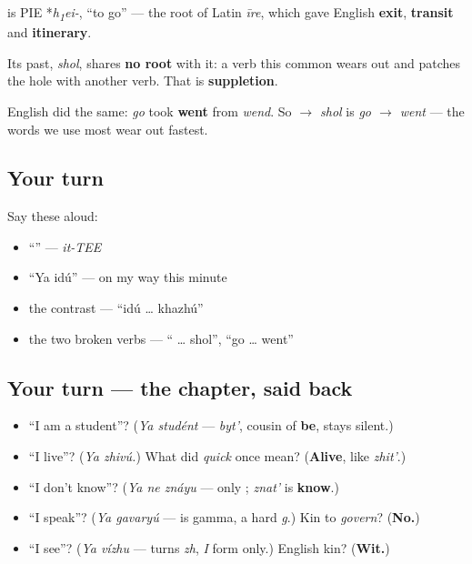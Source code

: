 \begin{cousinweb}
\textbf{} is PIE *\emph{h\textsubscript{1}ei-}, \textquotedblleft{}to go\textquotedblright{} — the root of Latin \emph{īre}, which gave English \textbf{exit}, \textbf{transit} and \textbf{itinerary}.

Its past, \emph{shol}, shares \textbf{no root} with it: a verb this common wears out and patches the hole with another verb. That is \textbf{suppletion}.

English did the same: \emph{go} took \textbf{went} from \emph{wend}. So \emph{ $\to$ shol} is \emph{go $\to$ went} — the words we use most wear out fastest.
\end{cousinweb}

\subsection*{Your turn}
Say these aloud:

\begin{itemize}
\raggedright
  \item \textquotedblleft{}\textquotedblright{} — \emph{it-TEE}
  \item \textquotedblleft{}Ya idú\textquotedblright{} — on my way this minute
  \item the contrast — \textquotedblleft{}idú … khazhú\textquotedblright{}
  \item the two broken verbs — \textquotedblleft{} … shol\textquotedblright{}, \textquotedblleft{}go … went\textquotedblright{}
\end{itemize}

\subsection*{Your turn — the chapter, said back}
\begin{itemize}
\raggedright
  \item \textquotedblleft{}I am a student\textquotedblright{}? (\emph{Ya studént} — \emph{byt'}, cousin of \textbf{be}, stays silent.)
  \item \textquotedblleft{}I live\textquotedblright{}? (\emph{Ya zhivú.}) What did \emph{quick} once mean? (\textbf{Alive}, like \emph{zhit'}.)
  \item \textquotedblleft{}I don't know\textquotedblright{}? (\emph{Ya ne znáyu} — only \textbf{}; \emph{znat'} is \textbf{know}.)
  \item \textquotedblleft{}I speak\textquotedblright{}? (\emph{Ya gavaryú} — \textbf{} is gamma, a hard \emph{g}.) Kin to \emph{govern}? (\textbf{No.})
  \item \textquotedblleft{}I see\textquotedblright{}? (\emph{Ya vízhu} — \textbf{} turns \emph{zh}, \emph{I} form only.) English kin? (\textbf{Wit.})
\end{itemize}

